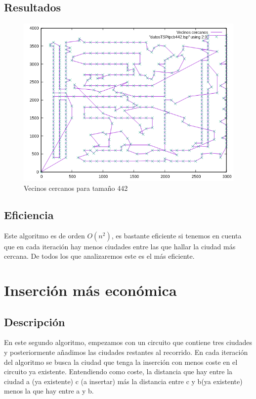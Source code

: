 \documentclass{article}
\begin{document}
	\subsection{Resultados}
	\begin{figure}[H]
		\centering
		\includegraphics[totalheight=8cm]{img/vecinos_cercanos}
		\caption{Vecinos cercanos para tamaño 442}
		\label{fig:vecinos_cercanos}
	\end{figure}
\subsection{Eficiencia}
Este algoritmo es de orden $O(n^2)$, es bastante eficiente si tenemos en cuenta que en cada iteración hay menos ciudades entre las que hallar la ciudad más cercana. De todos los que analizaremos este es el más eficiente.
	\section{Inserción más económica}
	\subsection{Descripción}
	En este segundo algoritmo, empezamos con un circuito que contiene tres ciudades y posteriormente añadimos las ciudades restantes al recorrido. En cada iteración del algoritmo se busca la ciudad que tenga la inserción con menos coste en el circuito ya existente. Entendiendo como coste, la distancia que hay entre la ciudad a (ya existente) c (a insertar) más la distancia entre c y b(ya existente) menos la que hay entre a y b.
	
\end{document}
